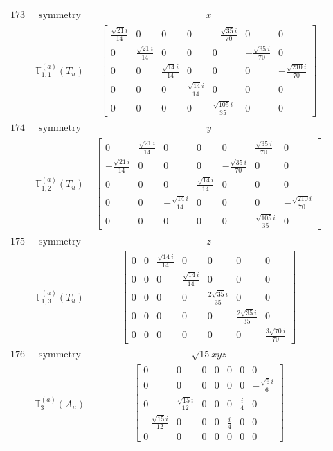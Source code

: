 \documentclass[fleqn,8pt,landscape]{jsarticle}
\begin{document}
\begin{longtable}{ccc}
$ 173 $ & $ \text{symmetry} $ & $ x $ \\
$  $ & $ \mathbb{T}_{1,1}^{(a)}(T_{u}) $ & $ \begin{bmatrix} \frac{\sqrt{21} i}{14} & 0 & 0 & 0 & - \frac{\sqrt{35} i}{70} & 0 & 0 \\ 0 & \frac{\sqrt{21} i}{14} & 0 & 0 & 0 & - \frac{\sqrt{35} i}{70} & 0 \\ 0 & 0 & \frac{\sqrt{14} i}{14} & 0 & 0 & 0 & - \frac{\sqrt{210} i}{70} \\ 0 & 0 & 0 & \frac{\sqrt{14} i}{14} & 0 & 0 & 0 \\ 0 & 0 & 0 & 0 & \frac{\sqrt{105} i}{35} & 0 & 0 \end{bmatrix} $ \\ \hline
$ 174 $ & $ \text{symmetry} $ & $ y $ \\
$  $ & $ \mathbb{T}_{1,2}^{(a)}(T_{u}) $ & $ \begin{bmatrix} 0 & \frac{\sqrt{21} i}{14} & 0 & 0 & 0 & \frac{\sqrt{35} i}{70} & 0 \\ - \frac{\sqrt{21} i}{14} & 0 & 0 & 0 & - \frac{\sqrt{35} i}{70} & 0 & 0 \\ 0 & 0 & 0 & \frac{\sqrt{14} i}{14} & 0 & 0 & 0 \\ 0 & 0 & - \frac{\sqrt{14} i}{14} & 0 & 0 & 0 & - \frac{\sqrt{210} i}{70} \\ 0 & 0 & 0 & 0 & 0 & \frac{\sqrt{105} i}{35} & 0 \end{bmatrix} $ \\ \hline
$ 175 $ & $ \text{symmetry} $ & $ z $ \\
$  $ & $ \mathbb{T}_{1,3}^{(a)}(T_{u}) $ & $ \begin{bmatrix} 0 & 0 & \frac{\sqrt{14} i}{14} & 0 & 0 & 0 & 0 \\ 0 & 0 & 0 & \frac{\sqrt{14} i}{14} & 0 & 0 & 0 \\ 0 & 0 & 0 & 0 & \frac{2 \sqrt{35} i}{35} & 0 & 0 \\ 0 & 0 & 0 & 0 & 0 & \frac{2 \sqrt{35} i}{35} & 0 \\ 0 & 0 & 0 & 0 & 0 & 0 & \frac{3 \sqrt{70} i}{70} \end{bmatrix} $ \\ \hline
$ 176 $ & $ \text{symmetry} $ & $ \sqrt{15} x y z $ \\
$  $ & $ \mathbb{T}_{3}^{(a)}(A_{u}) $ & $ \begin{bmatrix} 0 & 0 & 0 & 0 & 0 & 0 & 0 \\ 0 & 0 & 0 & 0 & 0 & 0 & - \frac{\sqrt{6} i}{6} \\ 0 & \frac{\sqrt{15} i}{12} & 0 & 0 & 0 & \frac{i}{4} & 0 \\ - \frac{\sqrt{15} i}{12} & 0 & 0 & 0 & \frac{i}{4} & 0 & 0 \\ 0 & 0 & 0 & 0 & 0 & 0 & 0 \end{bmatrix} $ \\ \hline

\end{longtable}
\end{document}
